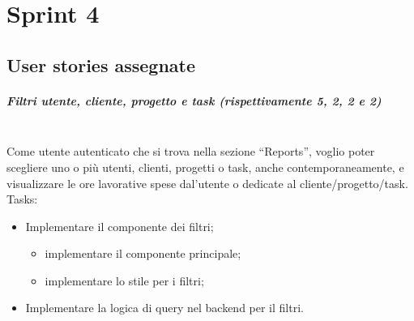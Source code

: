 
\chapter{Sprint 4}
\label{cap:sprint4}

\section{User stories assegnate}
\paragraph{Filtri utente, cliente, progetto e task (rispettivamente 5, 2, 2 e 2)}\mbox{} \\[\baselineskip]
\noindent Come utente autenticato che si trova nella sezione “Reports”, voglio poter scegliere uno o più utenti, clienti, progetti o task, anche contemporaneamente, e visualizzare le ore lavorative spese dal'utente o dedicate al cliente/progetto/task.\\

\noindent Tasks:

\begin{itemize}
  \item Implementare il componente dei filtri;
  \begin{itemize}
    \item implementare il componente principale;
    \item implementare lo stile per i filtri;
  \end{itemize}
  \item Implementare la logica di query nel backend per il filtri.
\end{itemize}

